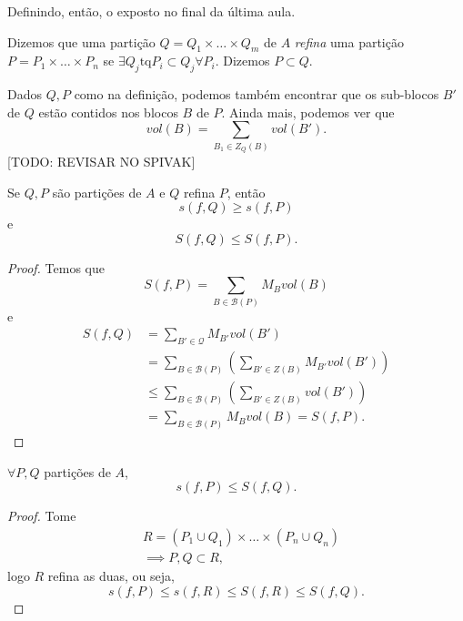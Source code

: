
Definindo, então, o exposto no final da última aula.

\begin{definition}
    Dizemos que uma partição $Q=Q_1\times \ldots\times Q_m$ de $A$ \emph{refina} uma partição $P=P_1\times \ldots\times P_n$ se $\exists Q_j \text{tq} P_i\subset Q_j \forall P_i$. Dizemos $P\subset Q$.
\end{definition}

Dados $Q, P$ como na definição, podemos também encontrar que os sub-blocos $B'$ de $Q$ estão contidos nos blocos $B$ de $P$. Ainda mais, podemos ver que \[
    vol\left( B \right) = \sum_{B_1\in Z_Q\left( B \right)  } vol\left( B' \right)
.\]  [TODO: REVISAR NO SPIVAK]

\begin{prop}
    Se $Q,P$ são partições de $A$ e $Q$ refina $P$, então \[
    s\left( f, Q \right) \ge s\left( f,P \right) 
    \] e \[
    S\left( f,Q \right) \le S\left( f,P \right) 
    .\] 
\end{prop}
\begin{proof}
    Temos que \[
        S\left( f, P \right) = \sum_{B\in \mathcal{B}\left( P \right) } M_B vol\left( B \right) 
    \] e 
    \begin{align*}
	S\left( f, Q \right) &=\sum_{B'\in \mathcal{Q}} M_{B'} vol\left( B' \right) \\
			     &= \sum_{B\in \mathcal{B}\left( P \right) } \left( 
				 \sum_{B'\in Z\left( B \right) } M_{B'} vol\left( B' \right) 
			     \right) \\
			     &\le \sum_{B\in \mathcal{B}\left( P \right) } \left( 
				 \sum_{B'\in Z\left( B \right) } vol\left( B' \right) 
			     \right) \\
			     &= \sum_{B\in \mathcal{B}\left( P \right) } M_B vol\left( B \right)  = S\left( f, P \right) 
    .\end{align*}
\end{proof}

\begin{corollary}
    $\forall P,Q$ partições de $A$, \[
    s\left( f, P \right) \le S\left( f,Q \right) 
    .\] 
\end{corollary}
\begin{proof}
    Tome
    \begin{align*}
	& R = \left( P_1\cup Q_1 \right) \times \ldots\times \left( P_n\cup Q_n \right) \\
	&\implies P,Q \subset R
    ,\end{align*}
    logo $R$ refina as duas, ou seja, \[
    s\left( f,P \right) \le s\left( f,R \right) \le S\left( f,R \right) \le S\left( f,Q \right) 
    .\] 
\end{proof}

